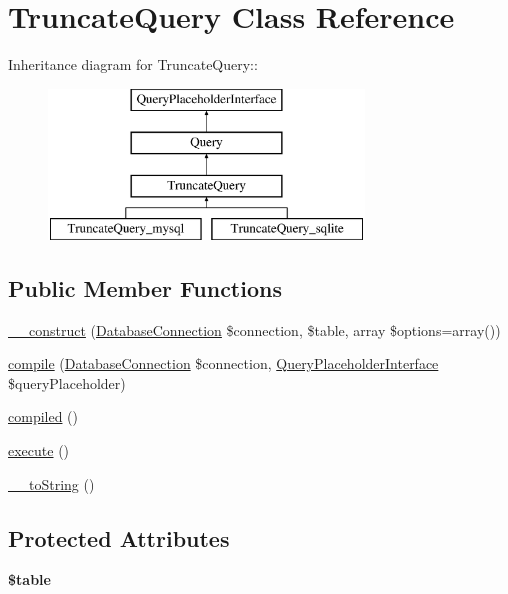 \hypertarget{classTruncateQuery}{
\section{TruncateQuery Class Reference}
\label{classTruncateQuery}
}
Inheritance diagram for TruncateQuery::\begin{figure}[H]
\begin{center}
\leavevmode
\includegraphics[height=4cm]{classTruncateQuery}
\end{center}
\end{figure}
\subsection*{Public Member Functions}
\begin{DoxyCompactItemize}
\item 
\hyperlink{classTruncateQuery_a10def81f62ada99bfb5d9f8124e8002b}{\_\-\_\-construct} (\hyperlink{classDatabaseConnection}{DatabaseConnection} \$connection, \$table, array \$options=array())
\item 
\hyperlink{classTruncateQuery_a052d10a3c9d1089483ee94b30f65514a}{compile} (\hyperlink{classDatabaseConnection}{DatabaseConnection} \$connection, \hyperlink{interfaceQueryPlaceholderInterface}{QueryPlaceholderInterface} \$queryPlaceholder)
\item 
\hyperlink{classTruncateQuery_ac29862ff0fcdc347618e2d79ddd94418}{compiled} ()
\item 
\hyperlink{classTruncateQuery_acc0ca130114686d1ddf4d3315f720c0e}{execute} ()
\item 
\hyperlink{classTruncateQuery_a4a18f66831b99b10cccd74c617fa6723}{\_\-\_\-toString} ()
\end{DoxyCompactItemize}
\subsection*{Protected Attributes}
\begin{DoxyCompactItemize}
\item 
\hypertarget{classTruncateQuery_a70129e81bd93d1b35678ef24f48a7aa5}{
{\bfseries \$table}}
\label{classTruncateQuery_a70129e81bd93d1b35678ef24f48a7aa5}

\end{DoxyCompactItemize}


